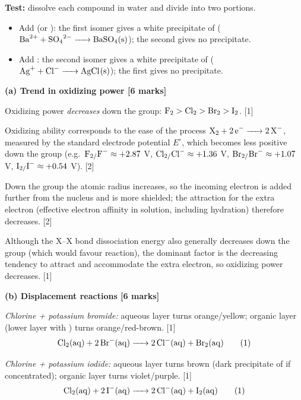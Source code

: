 \documentclass[11pt]{article}
\begin{document}
\begin{corrige}
\begin{enumerate}
\textbf{Test:} dissolve each compound in water and divide into two portions.
\begin{itemize}
\item Add  (or ): the first isomer gives a white precipitate of  ($\ce{Ba^{2+} + SO4^{2-} -> BaSO4(s)}$); the second gives no precipitate.
\item Add : the second isomer gives a white precipitate of  ($\ce{Ag^{+} + Cl^{-} -> AgCl(s)}$); the first gives no precipitate.
\end{itemize}
\end{enumerate}
\end{corrige}

\begin{corrige}
\textbf{(a) Trend in oxidizing power [6 marks]}

Oxidizing power \emph{decreases} down the group: $\ce{F2} > \ce{Cl2} > \ce{Br2} > \ce{I2}$. \hfill [1]

Oxidizing ability corresponds to the ease of the process $\ce{X2 + 2e- -> 2X^-}$, measured by the standard electrode potential $E^\circ$, which becomes less positive down the group (e.g.\ $\ce{F2/F^-} \approx +2.87$ V, $\ce{Cl2/Cl^-} \approx +1.36$ V, $\ce{Br2/Br^-} \approx +1.07$ V, $\ce{I2/I^-} \approx +0.54$ V). \hfill [2]

Down the group the atomic radius increases, so the incoming electron is added further from the nucleus and is more shielded; the attraction for the extra electron (effective electron affinity in solution, including hydration) therefore decreases. \hfill [2]

Although the X--X bond dissociation energy also generally decreases down the group (which would favour reaction), the dominant factor is the decreasing tendency to attract and accommodate the extra electron, so oxidizing power decreases. \hfill [1]

\textbf{(b) Displacement reactions [6 marks]}

\emph{Chlorine + potassium bromide:} aqueous layer turns orange/yellow; organic layer (lower layer with ) turns orange/red-brown. \hfill [1]
\[
\ce{Cl2(aq) + 2Br^{-}(aq) -> 2Cl^{-}(aq) + Br2(aq)} \tag{1}
\]

\emph{Chlorine + potassium iodide:} aqueous layer turns brown (dark precipitate of  if concentrated); organic layer turns violet/purple. \hfill [1]
\[
\ce{Cl2(aq) + 2I^{-}(aq) -> 2Cl^{-}(aq) + I2(aq)} \tag{1}
\]


\end{corrige}
\end{document}
